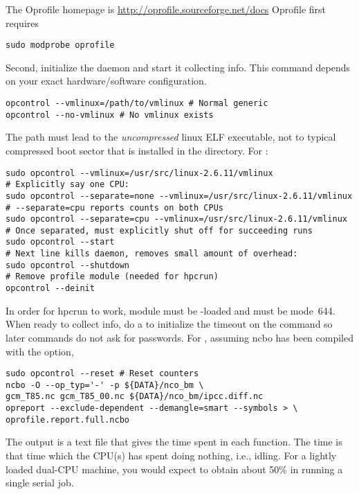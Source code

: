 \documentclass[12pt,twoside]{article}
\begin{document}
The Oprofile homepage is \url{http://oprofile.sourceforge.net/docs} 
Oprofile first requires
\begin{verbatim}
sudo modprobe oprofile
\end{verbatim}
Second, initialize the  daemon and start it
collecting info. 
This command depends on your exact hardware/software configuration.
\begin{verbatim}
opcontrol --vmlinux=/path/to/vmlinux # Normal generic
opcontrol --no-vmlinux # No vmlinux exists
\end{verbatim}
The path must lead to the \emph{uncompressed} linux ELF executable,
not to typical  compressed boot sector that is
installed in the  directory.
For :
\begin{verbatim}
sudo opcontrol --vmlinux=/usr/src/linux-2.6.11/vmlinux
# Explicitly say one CPU:
sudo opcontrol --separate=none --vmlinux=/usr/src/linux-2.6.11/vmlinux
# --separate=cpu reports counts on both CPUs
sudo opcontrol --separate=cpu --vmlinux=/usr/src/linux-2.6.11/vmlinux
# Once separated, must explicitly shut off for succeeding runs
sudo opcontrol --start
# Next line kills daemon, removes small amount of overhead:
sudo opcontrol --shutdown  
# Remove profile module (needed for hpcrun)
opcontrol --deinit
\end{verbatim}
In order for hpcrun to work,  module must be
-loaded and  must be mode~644.
When ready to collect info, do a  to initialize the
timeout on the  command so later commands do not ask for 
passwords.
For , assuming ncbo has been compiled with the
 option, 
\begin{verbatim}
sudo opcontrol --reset # Reset counters
ncbo -O --op_typ='-' -p ${DATA}/nco_bm \
gcm_T85.nc gcm_T85_00.nc ${DATA}/nco_bm/ipcc.diff.nc
opreport --exclude-dependent --demangle=smart --symbols > \
oprofile.report.full.ncbo
\end{verbatim}

The output is a text file that gives the time spent in each function. 
The  time is that time which the CPU(s) has spent
doing nothing, i.e., idling. 
For a lightly loaded dual-CPU machine, you would expect to obtain
about 50\% in  running a single serial job. 
\end{document}
